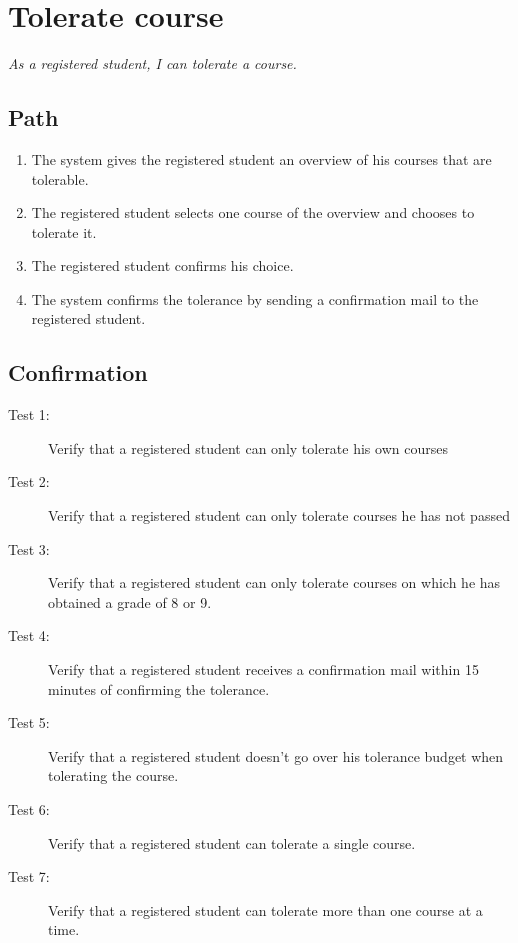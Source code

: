 \section{Tolerate course}

\par \emph{As a registered student, I can tolerate a course.}

\subsection{Path}

\begin{enumerate}
  \item The system gives the registered student an overview of his courses that
  are tolerable.
  \item The registered student selects one course of the overview and chooses to
  tolerate it.
  \item The registered student confirms his choice.
  \item The system confirms the tolerance by sending a confirmation mail to the
  registered student.
\end{enumerate}

\subsection{Confirmation}

\begin{description}
\item[Test 1:] Verify that a registered student can only tolerate his own
courses
\item[Test 2:] Verify that a registered student can only tolerate courses he has
not passed
\item[Test 3:] Verify that a registered student can only tolerate courses on
which he has obtained a grade of 8 or 9.
\item[Test 4:] Verify that a registered student receives a confirmation mail
within 15 minutes of confirming the tolerance.
\item[Test 5:] Verify that a registered student doesn't go over his tolerance
budget when tolerating the course.
\item[Test 6:] Verify that a registered student can tolerate a single course.
\item[Test 7:] Verify that a registered student can tolerate more than one
course at a time.
\end{description}
